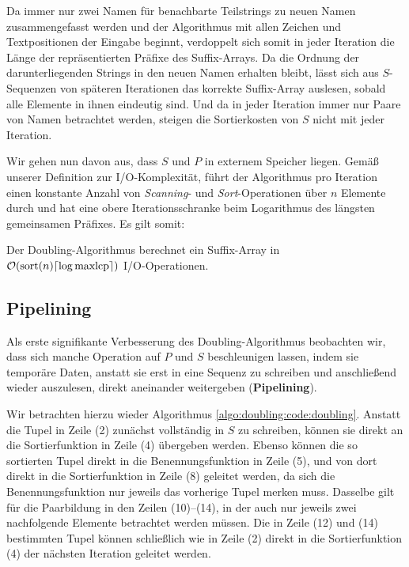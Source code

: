 Da immer nur zwei Namen für benachbarte Teilstrings zu neuen Namen zusammengefasst werden und der Algorithmus mit allen Zeichen und Textpositionen der Eingabe beginnt, verdoppelt sich somit in jeder Iteration die Länge der repräsentierten Präfixe des Suffix-Arrays. Da die Ordnung der darunterliegenden Strings in den neuen Namen erhalten bleibt, lässt sich aus $S$-Sequenzen von späteren Iterationen das korrekte Suffix-Array auslesen, sobald alle Elemente in ihnen eindeutig sind. Und da in jeder Iteration immer nur Paare von Namen betrachtet werden, steigen die Sortierkosten von $S$ nicht mit jeder Iteration.

Wir gehen nun davon aus, dass $S$ und $P$ in externem Speicher liegen. Gemäß unserer Definition zur I/O-Komplexität, führt der Algorithmus pro Iteration einen konstante Anzahl von \textit{Scanning}- und \textit{Sort}-Operationen über $n$ Elemente durch und hat eine obere Iterationsschranke beim Logarithmus des längsten gemeinsamen Präfixes. Es gilt somit:

\begin{theorem}
Der Doubling-Algorithmus berechnet ein Suffix-Array in\\ $\mathcal{O}(\text{sort}(n) \ceil*{\log \text{maxlcp}})$ I/O-Operationen.
\end{theorem}

\subsection{Pipelining}
\label{algo:doubling:sec:pipelining}

Als erste signifikante Verbesserung des Doubling-Algorithmus beobachten wir, dass sich manche Operation auf $P$ und $S$ beschleunigen lassen, indem sie temporäre Daten, anstatt sie erst in eine Sequenz zu schreiben und anschließend wieder auszulesen, direkt aneinander weitergeben (\textbf{Pipelining}). 

Wir betrachten hierzu wieder Algorithmus \ref{algo:doubling:code:doubling}. Anstatt die Tupel in Zeile (2) zunächst vollständig in $S$ zu schreiben, können sie direkt an die Sortierfunktion in Zeile (4) übergeben werden. Ebenso können die so sortierten Tupel direkt in die Benennungsfunktion in Zeile (5), und von dort direkt in die Sortierfunktion in Zeile (8) geleitet werden, da sich die Benennungsfunktion nur jeweils das vorherige Tupel merken muss. Dasselbe gilt für die Paarbildung in den Zeilen (10)--(14), in der auch nur jeweils zwei nachfolgende Elemente betrachtet werden müssen. Die in Zeile (12) und (14) bestimmten Tupel können schließlich wie in Zeile (2) direkt in die Sortierfunktion (4) der nächsten Iteration geleitet werden.

